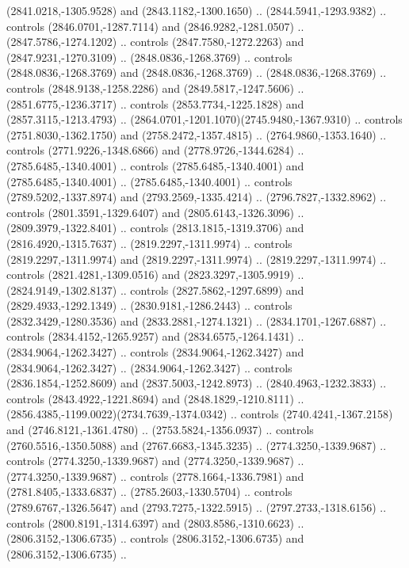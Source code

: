 \begin{scope}[shift={(28.3138,-376.6591)}]
\begin{scope}[shift={(-2186.6262,1813.8454)}]
      (2841.0218,-1305.9528) and (2843.1182,-1300.1650) .. (2844.5941,-1293.9382) ..
      controls (2846.0701,-1287.7114) and (2846.9282,-1281.0507) ..
      (2847.5786,-1274.1202) .. controls (2847.7580,-1272.2263) and
      (2847.9231,-1270.3109) .. (2848.0836,-1268.3769) .. controls
      (2848.0836,-1268.3769) and (2848.0836,-1268.3769) .. (2848.0836,-1268.3769) ..
      controls (2848.9138,-1258.2286) and (2849.5817,-1247.5606) ..
      (2851.6775,-1236.3717) .. controls (2853.7734,-1225.1828) and
      (2857.3115,-1213.4793) .. (2864.0701,-1201.1070)(2745.9480,-1367.9310) ..
      controls (2751.8030,-1362.1750) and (2758.2472,-1357.4815) ..
      (2764.9860,-1353.1640) .. controls (2771.9226,-1348.6866) and
      (2778.9726,-1344.6284) .. (2785.6485,-1340.4001) .. controls
      (2785.6485,-1340.4001) and (2785.6485,-1340.4001) .. (2785.6485,-1340.4001) ..
      controls (2789.5202,-1337.8974) and (2793.2569,-1335.4214) ..
      (2796.7827,-1332.8962) .. controls (2801.3591,-1329.6407) and
      (2805.6143,-1326.3096) .. (2809.3979,-1322.8401) .. controls
      (2813.1815,-1319.3706) and (2816.4920,-1315.7637) .. (2819.2297,-1311.9974) ..
      controls (2819.2297,-1311.9974) and (2819.2297,-1311.9974) ..
      (2819.2297,-1311.9974) .. controls (2821.4281,-1309.0516) and
      (2823.3297,-1305.9919) .. (2824.9149,-1302.8137) .. controls
      (2827.5862,-1297.6899) and (2829.4933,-1292.1349) .. (2830.9181,-1286.2443) ..
      controls (2832.3429,-1280.3536) and (2833.2881,-1274.1321) ..
      (2834.1701,-1267.6887) .. controls (2834.4152,-1265.9257) and
      (2834.6575,-1264.1431) .. (2834.9064,-1262.3427) .. controls
      (2834.9064,-1262.3427) and (2834.9064,-1262.3427) .. (2834.9064,-1262.3427) ..
      controls (2836.1854,-1252.8609) and (2837.5003,-1242.8973) ..
      (2840.4963,-1232.3833) .. controls (2843.4922,-1221.8694) and
      (2848.1829,-1210.8111) .. (2856.4385,-1199.0022)(2734.7639,-1374.0342) ..
      controls (2740.4241,-1367.2158) and (2746.8121,-1361.4780) ..
      (2753.5824,-1356.0937) .. controls (2760.5516,-1350.5088) and
      (2767.6683,-1345.3235) .. (2774.3250,-1339.9687) .. controls
      (2774.3250,-1339.9687) and (2774.3250,-1339.9687) .. (2774.3250,-1339.9687) ..
      controls (2778.1664,-1336.7981) and (2781.8405,-1333.6837) ..
      (2785.2603,-1330.5704) .. controls (2789.6767,-1326.5647) and
      (2793.7275,-1322.5915) .. (2797.2733,-1318.6156) .. controls
      (2800.8191,-1314.6397) and (2803.8586,-1310.6623) .. (2806.3152,-1306.6735) ..
      controls (2806.3152,-1306.6735) and (2806.3152,-1306.6735) ..

\end{scope}
\end{scope}
